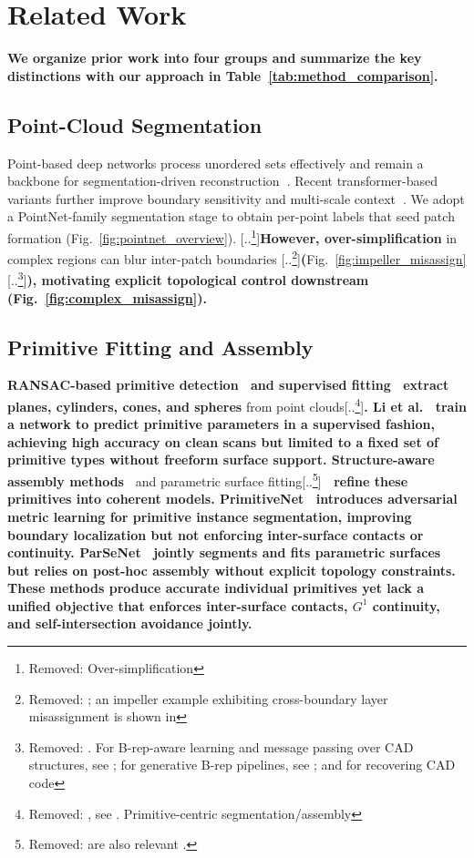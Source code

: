 \documentclass{ieeeaccess}
\providecommand{\DIFaddtex}[1]{{\color{blue}\bfseries #1}} %
\providecommand{\DIFdeltex}[1]{{\color{red}[..\footnote{\color{black}Removed: #1}]}} %
\providecommand{\DIFaddbegin}{} %
\providecommand{\DIFaddend}{} %
\providecommand{\DIFdelbegin}{} %
\providecommand{\DIFdelend}{} %
\providecommand{\DIFadd}[1]{\texorpdfstring{\DIFaddtex{#1}}{#1}} %
\providecommand{\DIFdel}[1]{\texorpdfstring{\DIFdeltex{#1}}{}} %
\begin{document}
\DIFaddend \section{Related Work}
\label{sec:related}
\DIFaddbegin 

\DIFadd{We organize prior work into four groups and summarize the key
distinctions with our approach in Table~\ref{tab:method_comparison}.
}

\subsection{\DIFadd{Point-Cloud Segmentation}}
\DIFaddend Point-based deep networks process unordered sets effectively and remain a backbone for segmentation-driven reconstruction\DIFaddbegin \DIFadd{~}\DIFaddend \cite{b7,b8}. Recent transformer-based variants further improve boundary sensitivity and multi-scale context\DIFaddbegin \DIFadd{~}\DIFaddend \cite{b23}. We adopt a PointNet-family segmentation stage to obtain per-point labels that seed patch formation (Fig.~\ref{fig:pointnet_overview}). \DIFdelbegin \DIFdel{Over-simplification }\DIFdelend \DIFaddbegin \DIFadd{However, over-simplification }\DIFaddend in complex regions can blur inter-patch boundaries \DIFdelbegin \DIFdel{; an impeller example exhibiting cross-boundary layer misassignment is shown in }\DIFdelend \DIFaddbegin \DIFadd{(}\DIFaddend Fig.~\ref{fig:impeller_misassign}\DIFdelbegin \DIFdel{. For B-rep-aware learning and message passing over CAD structures, see \cite{b3,b9}; for generative B-rep pipelines, see \cite{b1,b4,b20}; and for recovering CAD code }\DIFdelend \DIFaddbegin \DIFadd{), motivating explicit topological control downstream (Fig.~\ref{fig:complex_misassign}).
}

\subsection{\DIFadd{Primitive Fitting and Assembly}}
\DIFadd{RANSAC-based primitive detection~\cite{b15} and supervised fitting~\cite{b27} extract planes, cylinders, cones, and spheres }\DIFaddend from point clouds\DIFdelbegin \DIFdel{, see \cite{b24}. Primitive-centric segmentation/assembly }\DIFdelend \DIFaddbegin \DIFadd{. Li et al.~\cite{b27} train a network to predict primitive parameters in a supervised fashion, achieving high accuracy on clean scans but limited to a fixed set of primitive types without freeform surface support. Structure-aware assembly methods~\cite{b14,b19} }\DIFaddend and parametric surface fitting\DIFdelbegin \DIFdel{are also relevant \cite{b14,b18,b19,b22}. }\DIFdelend \DIFaddbegin \DIFadd{~\cite{b22} refine these primitives into coherent models. PrimitiveNet~\cite{b28} introduces adversarial metric learning for primitive instance segmentation, improving boundary localization but not enforcing inter-surface contacts or continuity. ParSeNet~\cite{b19} jointly segments and fits parametric surfaces but relies on post-hoc assembly without explicit topology constraints. These methods produce accurate individual primitives yet lack a unified objective that enforces inter-surface contacts, $G^1$ continuity, and self-intersection avoidance jointly.
}
\end{document}
